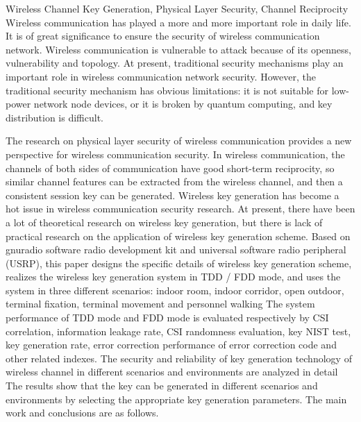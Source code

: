 \documentclass[master]{seuthesis} %
\begin{document}
\begin{abstract}{无线信道密钥生成，物理层安全，信道互易性}
\begin{itemize}
    \item FDD模式下，本文使用搭建的无线密钥生成系统在相同的9种情况下连续长时间测量无线信道并生成密钥，并分析多项指标。实验结果表明，FDD模式下，合法通信双方CSI之间互易性并不完全好于和窃听者的互易性，其平均信息安全率也较差于FDD模式。FDD模式下不同情况下的CSI图像熵与TDD模式相似，但是其生成密钥在NIST随机性测试中的表现稍逊与FDD模式。在密钥生成速率方面，由于FDD模式下密钥一致率的降低，相同的降采样率下，TDD模式的密钥生成速率约为FDD模式的3倍。同时，由于相同的原因，FDD模式下的纠错码调和方案表现较差，在密钥一致率较低时，恢复的消息具有较大的误比特率。
\end{itemize}
\quad %
\end{abstract}

\begin{englishabstract}{Wireless Channel Key Generation, Physical Layer Security, Channel Reciprocity}
    Wireless communication has played a more and more important role in daily life. It is of great significance to ensure the security of wireless communication network. Wireless communication is vulnerable to attack because of its openness, vulnerability and topology. At present, traditional security mechanisms play an important role in wireless communication network security. However, the traditional security mechanism has obvious limitations: it is not suitable for low-power network node devices, or it is broken by quantum computing, and key distribution is difficult.
    
    The research on physical layer security of wireless communication provides a new perspective for wireless communication security. In wireless communication, the channels of both sides of communication have good short-term reciprocity, so similar channel features can be extracted from the wireless channel, and then a consistent session key can be generated. Wireless key generation has become a hot issue in wireless communication security research. At present, there have been a lot of theoretical research on wireless key generation, but there is lack of practical research on the application of wireless key generation scheme. Based on gnuradio software radio development kit and universal software radio peripheral (USRP), this paper designs the specific details of wireless key generation scheme, realizes the wireless key generation system in TDD / FDD mode, and uses the system in three different scenarios: indoor room, indoor corridor, open outdoor, terminal fixation, terminal movement and personnel walking The system performance of TDD mode and FDD mode is evaluated respectively by CSI correlation, information leakage rate, CSI randomness evaluation, key NIST test, key generation rate, error correction performance of error correction code and other related indexes. The security and reliability of key generation technology of wireless channel in different scenarios and environments are analyzed in detail The results show that the key can be generated in different scenarios and environments by selecting the appropriate key generation parameters. The main work and conclusions are as follows.
    

\end{englishabstract}
\end{document}
